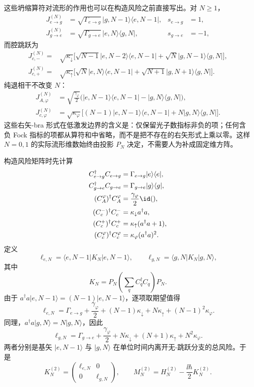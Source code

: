 这些坍缩算符对流形的作用也可以在构造风险之前直接写出。对 $N\ge1$，
\begin{align}
J_{e\to g}^{(N)}
&=\sqrt{\Gamma_{e\to g}}\,
|g,N-1\rangle\langle e,N-1|,
& s_{e\to g}&=1,\\
J_{g\to e}^{(N)}
&=\sqrt{\Gamma_{g\to e}}\,
|e,N\rangle\langle g,N|,
& s_{g\to e}&=-1,
\end{align}
而腔跳跃为
\begin{align}
J_{c,-}^{(N)}
={}&\sqrt{\kappa_\downarrow}\big[
\sqrt{N-1}|e,N-2\rangle\langle e,N-1|
+\sqrt N|g,N-1\rangle\langle g,N|\big],\\
J_{c,+}^{(N)}
={}&\sqrt{\kappa_\uparrow}\big[
\sqrt N|e,N\rangle\langle e,N-1|
+\sqrt{N+1}|g,N+1\rangle\langle g,N|\big].
\end{align}
纯退相干不改变 $N$：
\begin{align}
J_{A,\varphi}^{(N)}
&=\sqrt{\frac{\gamma_\varphi}{2}}
\big(|e,N-1\rangle\langle e,N-1|-|g,N\rangle\langle g,N|\big),\\
J_{c,\varphi}^{(N)}
&=\sqrt{\kappa_\varphi}
\big[(N-1)|e,N-1\rangle\langle e,N-1|
+N|g,N\rangle\langle g,N|\big].
\end{align}
这些右矢-bra 形式在低激发边界的含义是：仅保留光子数指标非负的项；任何含负 Fock 指标的项都从算符和中省略，而不是把不存在的右矢形式上乘以零。这样 $N=0,1$ 的实际流形维数始终由投影 $P_N$ 决定，不需要人为补成固定维方阵。

构造风险矩阵时先计算
\[
\begin{aligned}
C_{e\to g}^\dagger C_{e\to g}&=\Gamma_{e\to g}|e\rangle\langle e|,\\
C_{g\to e}^\dagger C_{g\to e}&=\Gamma_{g\to e}|g\rangle\langle g|,\\
(C_A^\varphi)^\dagger C_A^\varphi&=\frac{\gamma_\varphi}{2}\id(),\\
(C_c^-)^\dagger C_c^-&=\kappa_\downarrow a^\dagger a,\\
(C_c^+)^\dagger C_c^+&=\kappa_\uparrow(a^\dagger a+1),\\
(C_c^\varphi)^\dagger C_c^\varphi&=\kappa_\varphi(a^\dagger a)^2.
\end{aligned}
\]
定义
\[
\ell_{e,N}=\langle e,N-1|K_N|e,N-1\rangle,
\qquad
\ell_{g,N}=\langle g,N|K_N|g,N\rangle,
\]
其中
\[
K_N=P_N\left(\sum_qC_q^\dagger C_q\right)P_N.
\]
由于 $a^\dagger a|e,N-1\rangle=(N-1)|e,N-1\rangle$，逐项取期望值得
\[
\ell_{e,N}
=\Gamma_{e\to g}+\frac{\gamma_\varphi}{2}
+(N-1)\kappa_\downarrow+N\kappa_\uparrow
+(N-1)^2\kappa_\varphi.
\]
同理，$a^\dagger a|g,N\rangle=N|g,N\rangle$，因此
\[
\ell_{g,N}
=\Gamma_{g\to e}+\frac{\gamma_\varphi}{2}
+N\kappa_\downarrow+(N+1)\kappa_\uparrow
+N^2\kappa_\varphi.
\]
两者分别是基矢 $|e,N-1\rangle$ 与 $|g,N\rangle$ 在单位时间内离开无-跳跃分支的总风险。于是
\begin{equation}
K_N^{(2)}=\begin{pmatrix}\ell_{e,N}&0\\0&\ell_{g,N}\end{pmatrix},
\qquad
M_N^{(2)}=H_N^{(2)}-\frac{\ii\hbar}{2}K_N^{(2)}.
\label{eq:phys-oqs-mn2}
\end{equation}

